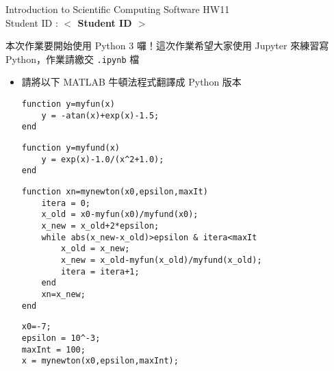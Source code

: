 \documentclass[12pt,a4paper]{article}
\newcommand{\placeholder}[1]{\textbf{$<$ #1 $>$}}
\newcommand{\idnumber}{\placeholder{Student ID}}
\begin{document}
\begin{CJK}{UTF8}{bsmi}
\begin{flushleft}Introduction to Scientific Computing Software HW11
\\Student ID : \idnumber{}\end{flushleft}

本次作業要開始使用 Python 3 囉！這次作業希望大家使用 Jupyter 來練習寫 Python，作業請繳交 \texttt{.ipynb} 檔
\begin{itemize}
\item 請將以下 MATLAB 牛頓法程式翻譯成 Python 版本


\begin{lstlisting}[frame=single,caption=myfun.m]
function y=myfun(x)
    y = -atan(x)+exp(x)-1.5;
end
\end{lstlisting}

\begin{lstlisting}[frame=single,caption=myfund.m]
function y=myfund(x)
    y = exp(x)-1.0/(x^2+1.0);
end
\end{lstlisting}

\begin{lstlisting}[frame=single,caption=mynewton.m]
function xn=mynewton(x0,epsilon,maxIt)
    itera = 0;
    x_old = x0-myfun(x0)/myfund(x0);
    x_new = x_old+2*epsilon;
    while abs(x_new-x_old)>epsilon & itera<maxIt
        x_old = x_new;
        x_new = x_old-myfun(x_old)/myfund(x_old);
        itera = itera+1;
    end
    xn=x_new;
end
\end{lstlisting}

\begin{lstlisting}[frame=single,caption=hw11.m]
x0=-7;
epsilon = 10^-3;
maxInt = 100;
x = mynewton(x0,epsilon,maxInt);
\end{lstlisting}
\end{itemize}
\end{CJK}
\end{document}
